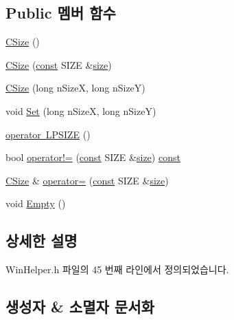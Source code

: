 \subsection*{Public 멤버 함수}
\begin{DoxyCompactItemize}
\item 
\mbox{\hyperlink{class_win_helper_1_1_c_size_a65e3aa2cd3a44f989a5088fb53cf0422}{C\+Size}} ()
\item 
\mbox{\hyperlink{class_win_helper_1_1_c_size_a1029bcc5ddd408e57f98841d286396f9}{C\+Size}} (\mbox{\hyperlink{getopt1_8c_a2c212835823e3c54a8ab6d95c652660e}{const}} S\+I\+ZE \&\mbox{\hyperlink{expr-lex_8cpp_ab7d671599a7b25ca99a487fa341bc33a}{size}})
\item 
\mbox{\hyperlink{class_win_helper_1_1_c_size_a69f59e4395efcfabd5ab7b6c3f212fce}{C\+Size}} (long n\+SizeX, long n\+SizeY)
\item 
void \mbox{\hyperlink{class_win_helper_1_1_c_size_a05bf66bfb3fdc5d19da8630983640e5c}{Set}} (long n\+SizeX, long n\+SizeY)
\item 
\mbox{\hyperlink{class_win_helper_1_1_c_size_a44e73f4780871e2980e00c9666de3fb9}{operator L\+P\+S\+I\+ZE}} ()
\item 
bool \mbox{\hyperlink{class_win_helper_1_1_c_size_a745dfa0f95195b3120b6aba2f2346d93}{operator!=}} (\mbox{\hyperlink{getopt1_8c_a2c212835823e3c54a8ab6d95c652660e}{const}} S\+I\+ZE \&\mbox{\hyperlink{expr-lex_8cpp_ab7d671599a7b25ca99a487fa341bc33a}{size}}) \mbox{\hyperlink{getopt1_8c_a2c212835823e3c54a8ab6d95c652660e}{const}}
\item 
\mbox{\hyperlink{class_win_helper_1_1_c_size}{C\+Size}} \& \mbox{\hyperlink{class_win_helper_1_1_c_size_a16db5b403ae9c1b8aaff262dba25c5aa}{operator=}} (\mbox{\hyperlink{getopt1_8c_a2c212835823e3c54a8ab6d95c652660e}{const}} S\+I\+ZE \&\mbox{\hyperlink{expr-lex_8cpp_ab7d671599a7b25ca99a487fa341bc33a}{size}})
\item 
void \mbox{\hyperlink{class_win_helper_1_1_c_size_a8ee92c406fa48d19ceaf5709d372126c}{Empty}} ()
\end{DoxyCompactItemize}


\subsection{상세한 설명}


Win\+Helper.\+h 파일의 45 번째 라인에서 정의되었습니다.



\subsection{생성자 \& 소멸자 문서화}
\mbox{\label{class_win_helper_1_1_c_size_a65e3aa2cd3a44f989a5088fb53cf0422}} 
